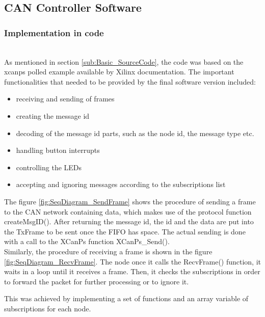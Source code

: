 
\subsection{CAN Controller Software}
\subsubsection{Implementation in code}~\\
As mentioned in section \ref{sub:Basic_SourceCode}, the code was based on the xcanps polled example available by Xilinx documentation.
The important functionalities that needed to be provided by the final software version included:
\begin{itemize}
\item receiving and sending of frames
\item creating the message id
\item decoding of the message id parts, such as the node id, the message type etc. 
\item handling button interrupts
\item controlling the LEDs
\item accepting and ignoring messages according to the subscriptions list
\end{itemize}
The figure \ref{fig:SeqDiagram_SendFrame} shows the procedure of sending a frame to the CAN network containing data, which makes use of the protocol function createMsgID().
After returning the message id, the id and the data are put into the TxFrame to be sent once the FIFO has space.
The actual sending is done with a call to the XCanPs function XCanPs\_Send().
\\
Similarly, the procedure of receiving a frame is shown in the figure \ref{fig:SeqDiagram_RecvFrame}.
The node once it calls the RecvFrame() function, it waits in a loop until it receives a frame. Then, it checks the subscriptions in order to forward the packet for further processing or to ignore it.


This was achieved by implementing a set of functions and an array variable of subscriptions for each node.


